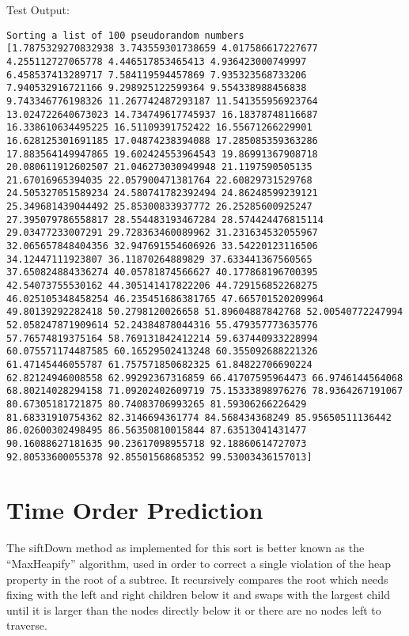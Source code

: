 \documentclass{article}
\begin{document}
Test Output:
\begin{lstlisting}
Sorting a list of 100 pseudorandom numbers
[1.7875329270832938 3.743559301738659 4.017586617227677 4.255112727065778 4.446517853465413 4.936423000749997 6.458537413289717 7.584119594457869 7.935323568733206 7.940532916721166 9.298925122599364 9.554338988456838 9.743346776198326 11.267742487293187 11.541355956923764 13.024722640673023 14.734749617745937 16.18378748116687 16.338610634495225 16.51109391752422 16.55671266229901 16.628125301691185 17.04874238394088 17.285085359363286 17.883564149947865 19.602424553964543 19.86991367908718 20.080611912602507 21.046273030949948 21.1197590505135 21.67016965394035 22.057900471381764 22.60829731529768 24.505327051589234 24.580741782392494 24.86248599239121 25.349681439044492 25.85300833937772 26.25285600925247 27.395079786558817 28.554483193467284 28.574424476815114 29.03477233007291 29.728363460089962 31.231634532055967 32.065657848404356 32.947691554606926 33.54220123116506 34.12447111923807 36.11870264889829 37.633441367560565 37.650824884336274 40.05781874566627 40.177868196700395 42.54073755530162 44.305141417822206 44.729156852268275 46.025105348458254 46.235451686381765 47.665701520209964 49.80139292282418 50.2798120026658 51.89604887842768 52.00540772247994 52.058247871909614 52.24384878044316 55.479357773635776 57.76574819375164 58.769131842412214 59.637440933228994 60.075571174487585 60.16529502413248 60.355092688221326 61.47145446055787 61.757571850682325 61.84822706690224 62.82124946008558 62.99292367316859 66.41707595964473 66.9746144564068 68.80214028294158 71.09202402609719 75.15333898976276 78.9364267191067 80.67305181721875 80.74083706993265 81.59306266226429 81.68331910754362 82.3146694361774 84.568434368249 85.95650511136442 86.02600302498495 86.56350810015844 87.63513041431477 90.16088627181635 90.23617098955718 92.18860614727073 92.80533600055378 92.85501568685352 99.53003436157013]
\end{lstlisting}



\section{Time Order Prediction}
The siftDown method as implemented for this sort is better known as the ``MaxHeapify'' algorithm, used in order to correct a single violation of the heap property in the root of a subtree. It recursively compares the root which needs fixing with the left and right children below it and swaps with the largest child until it is larger than the nodes directly below it or there are no nodes left to traverse.
\end{document}
